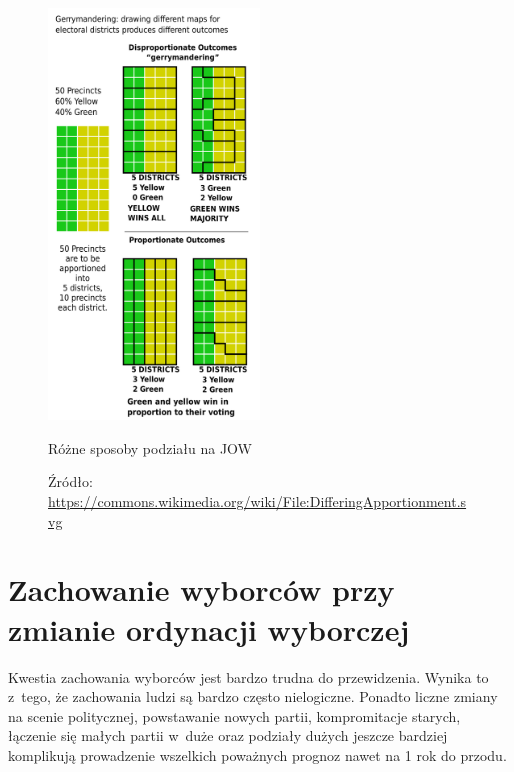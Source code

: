 \begin{figure}[H]
    \centering
    \includegraphics[width=0.5\textwidth]{rozdzial2/800px-DifferingApportionment.svg.png}
    \caption{Różne sposoby podziału na JOW}
    \caption*{Źródło: \url{https://commons.wikimedia.org/wiki/File:DifferingApportionment.svg}}
    \label{fig:my_label}
\end{figure}

\section{Zachowanie wyborców przy zmianie ordynacji wyborczej}

Kwestia zachowania wyborców jest bardzo trudna do przewidzenia. Wynika to z~tego, że zachowania ludzi są bardzo często nielogiczne. Ponadto liczne zmiany na scenie politycznej, powstawanie nowych partii, kompromitacje starych, łączenie się małych partii w~duże oraz podziały dużych jeszcze bardziej komplikują prowadzenie wszelkich poważnych prognoz nawet na 1 rok do przodu. 

